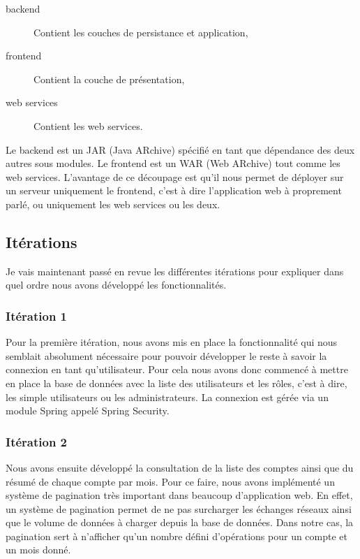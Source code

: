 \begin{description}
	\item[backend] Contient les couches de persistance et application,
	\item[frontend] Contient la couche de présentation,
	\item[web services] Contient les web services.\\
\end{description}

Le backend est un JAR (Java ARchive) spécifié en tant que dépendance des deux autres sous modules. Le frontend est un WAR (Web ARchive) tout comme les web services. L'avantage de ce découpage est qu'il nous permet de déployer sur un serveur uniquement le frontend, c'est à dire l'application web à proprement parlé, ou uniquement les web services ou les deux.

\subsection{Itérations}

Je vais maintenant passé en revue les différentes itérations pour expliquer dans quel ordre nous avons développé les fonctionnalités.

\subsubsection{Itération 1}

Pour la première itération, nous avons mis en place la fonctionnalité qui nous semblait absolument nécessaire pour pouvoir développer le reste à savoir la connexion en tant qu'utilisateur. Pour cela nous avons donc commencé à mettre en place la base de données avec la liste des utilisateurs et les rôles, c'est à dire, les simple utilisateurs ou les administrateurs. La connexion est gérée via un module Spring appelé Spring Security.

\subsubsection{Itération 2}

Nous avons ensuite développé la consultation de la liste des comptes ainsi que du résumé de chaque compte par mois. Pour ce faire, nous avons implémenté un système de pagination très important dans beaucoup d'application web. En effet, un système de pagination permet de ne pas surcharger les échanges réseaux ainsi que le volume de données à charger depuis la base de données. Dans notre cas, la pagination sert à n'afficher qu'un nombre défini d'opérations pour un compte et un mois donné.

